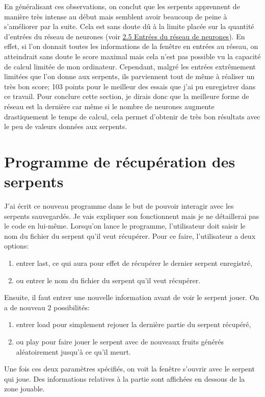 \documentclass[12pt, a4paper, openany]{book}
\begin{document}
En généralisant ces observations, on conclut que les serpents apprennent de manière très intense au début mais semblent avoir beaucoup de peine à s'améliorer par la suite. Cela est sans doute dû à la limite placée sur la quantité d'entrées du réseau de neurones (voir \hyperref[r:2.5]{2.5 Entrées du réseau de neurones}). En effet, si l'on donnait toutes les informations de la fenêtre en entrées au réseau, on atteindrait sans doute le score maximal mais cela n'est pas possible vu la capacité de calcul limitée de mon ordinateur. Cependant, malgré les entrées extrêmement limitées que l'on donne aux serpents, ils parviennent tout de même à réaliser un très bon score; 103 points pour le meilleur des essais que j'ai pu enregistrer dans ce travail. Pour conclure cette section, je dirais donc que la meilleure forme de réseau est la dernière car même si le nombre de neurones augmente drastiquement le temps de calcul, cela permet d'obtenir de très bon résultats avec le peu de valeurs données aux serpents.

\section{Programme de récupération des serpents}
\label{r:2.9}
J'ai écrit ce nouveau programme dans le but de pouvoir interagir avec les serpents sauvegardés. Je vais expliquer son fonctionnent mais je ne détaillerai pas le code en lui-même.
Lorsqu'on lance le programme, l'utilisateur doit saisir le nom du fichier du serpent qu'il veut récupérer. Pour ce faire, l'utilisateur a deux options:
\begin{enumerate}
	\item entrer \og{}last\fg{}, ce qui aura pour effet de récupérer le dernier serpent enregistré,
	\item ou entrer le nom du fichier du serpent qu'il veut récupérer.
\end{enumerate}
Ensuite, il faut entrer une nouvelle information avant de voir le serpent jouer. On a de nouveau 2 possibilités:
\begin{enumerate}
	\item entrer \og{}load\fg{} pour simplement rejouer la dernière partie du serpent récupéré,
	\item ou \og{}play\fg{} pour faire jouer le serpent avec de nouveaux fruits générés aléatoirement jusqu'à ce qu'il meurt.
\end{enumerate}
Une fois ces deux paramètres spécifiés, on voit la fenêtre s'ouvrir avec le serpent qui joue. Des informations relatives à la partie sont affichées en dessous de la zone jouable.
\end{document}
